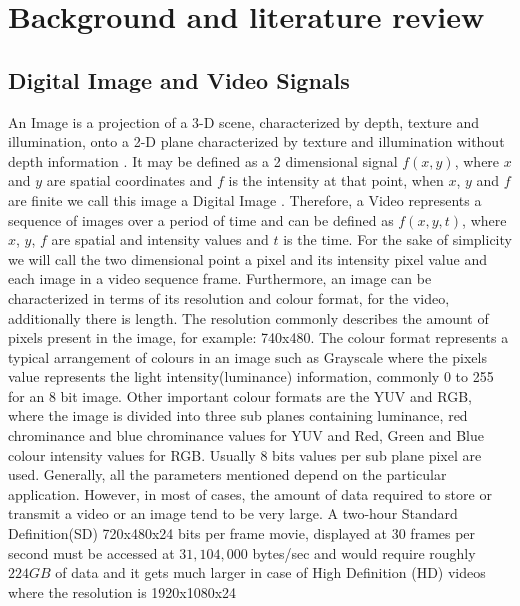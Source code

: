 \documentclass[a4paper,11pt,oneside]{article}
\begin{document}
\section{Background and literature review}
\subsection{Digital Image and Video Signals}
\indent An Image is a projection of a 3-D scene, characterized by depth, texture and illumination, onto a 2-D plane characterized by texture and illumination
without depth information \cite[p.~5]{richardson2002video}. It may be defined as a 2 dimensional signal $ f(x, y) $, where $x$ and $y$ are spatial
coordinates and $f$ is the intensity at that point, when $x$, $y$ and $f$ are finite we call this image a Digital Image \cite[p.~1]{gonzalez2008digital}.
Therefore, a Video represents a sequence of images over a period of time and can be defined as $f(x,y,t)$, where $x$, $y$, $f$ are spatial and intensity values
and $t$ is the time.
For the sake of simplicity we will call the two dimensional point a pixel and its intensity pixel value and each image in a video sequence frame.
Furthermore, an image can be characterized in terms of its resolution and colour format, for the video, additionally there is length. The resolution
commonly describes the amount of pixels present in the image, for example: 740x480. The colour format represents a typical arrangement of colours in an image such as Grayscale
where the pixels value represents the light intensity(luminance) information, commonly 0 to 255 for an 8 bit image. Other important colour formats are the YUV and RGB, where the
image is divided into three sub planes containing luminance, red chrominance and blue chrominance values for YUV and Red, Green and Blue colour intensity values for RGB. Usually 8
bits values per sub plane pixel   are used. Generally, all the parameters mentioned depend on the particular application. However, in most of cases, the amount of data required to
store or transmit a video or an image tend to be very large. A two-hour Standard Definition(SD) 720x480x24 bits per frame movie, displayed at 30 frames per second must be accessed
at $ 31,104,000 $ bytes/sec
and would require roughly $224 GB$ of data and it gets much larger in case of High Definition (HD) videos where the resolution is 1920x1080x24 \cite[p.~525-526]{gonzalez2008digital} \\
\end{document}
